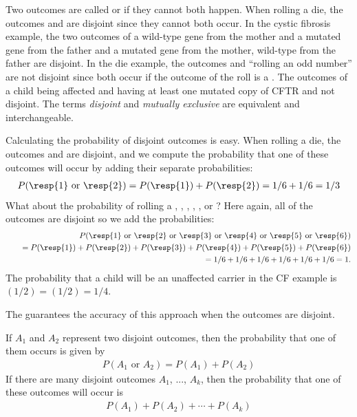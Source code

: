 
Two outcomes are called  or  if they cannot both happen. When rolling a die, the outcomes  and  are disjoint since they cannot both occur.  In the cystic fibrosis example, the two outcomes of a wild-type gene from the mother and a mutated gene from the father and a mutated gene from the mother, wild-type from the father are disjoint.   In the die example, the outcomes  and ``rolling an odd number'' are not disjoint since both occur if the outcome of the roll is a . The outcomes of a child being affected and having at least one mutated copy of CFTR and  not disjoint. The terms \emph{disjoint} and \emph{mutually exclusive} are equivalent and interchangeable.

Calculating the probability of disjoint outcomes is easy. When rolling a die, the outcomes  and  are disjoint, and we compute the probability that one of these outcomes will occur by adding their separate probabilities:
\begin{eqnarray*}
P(\text{\resp{1} or \resp{2}}) = P(\text{\resp{1}})+P(\text{\resp{2}}) = 1/6 + 1/6 = 1/3
\end{eqnarray*}
What about  the probability of rolling a , , , , , or ? Here again, all of the outcomes are disjoint so we add the probabilities:
\begin{eqnarray*}
&&P(\text{\resp{1} or \resp{2} or \resp{3} or \resp{4} or \resp{5} or \resp{6}}) \\
	&&\quad= P(\text{\resp{1}})+P(\text{\resp{2}})+P(\text{\resp{3}})+P(\text{\resp{4}})+P(\text{\resp{5}})+P(\text{\resp{6}}) \\
	&&\quad= 1/6 + 1/6 + 1/6 + 1/6 + 1/6 + 1/6 = 1.
\end{eqnarray*}
The probability that a child will be an unaffected carrier in the CF example is $(1/2) = (1/2) = 1/4$.

The  guarantees the accuracy of this approach when the outcomes are disjoint. 

\begin{termBox}{ If $A_1$ and $A_2$ represent two disjoint outcomes, then the probability that one of them occurs is given by
\begin{eqnarray*}
P(A_1\text{ or } A_2) = P(A_1) + P(A_2)
\end{eqnarray*}
If there are many disjoint outcomes $A_1$, ..., $A_k$, then the probability that one of these outcomes will occur is
\begin{eqnarray}
P(A_1) + P(A_2) + \cdots + P(A_k)
\end{eqnarray}
}
\end{termBox}

